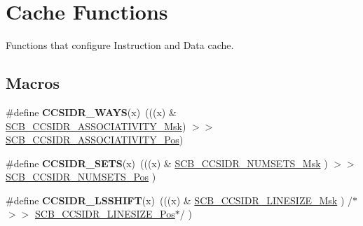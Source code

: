\hypertarget{group__CMSIS__Core__CacheFunctions}{}\section{Cache Functions}
\label{group__CMSIS__Core__CacheFunctions}


Functions that configure Instruction and Data cache.  


\subsection*{Macros}
\begin{DoxyCompactItemize}
\item 
\#define {\bfseries C\+C\+S\+I\+D\+R\+\_\+\+W\+A\+YS}(x)~(((x) \& \hyperlink{group__CMSIS__SCB_gae093c4c635dad43845967512fa87173a}{S\+C\+B\+\_\+\+C\+C\+S\+I\+D\+R\+\_\+\+A\+S\+S\+O\+C\+I\+A\+T\+I\+V\+I\+T\+Y\+\_\+\+Msk}) $>$$>$ \hyperlink{group__CMSIS__SCB_gae67f2f83976b819fb3039fc35cfef0fb}{S\+C\+B\+\_\+\+C\+C\+S\+I\+D\+R\+\_\+\+A\+S\+S\+O\+C\+I\+A\+T\+I\+V\+I\+T\+Y\+\_\+\+Pos})\hypertarget{group__CMSIS__Core__CacheFunctions_ga3d672529cd193537fe2a0141931c6ad9}{}\label{group__CMSIS__Core__CacheFunctions_ga3d672529cd193537fe2a0141931c6ad9}

\item 
\#define {\bfseries C\+C\+S\+I\+D\+R\+\_\+\+S\+E\+TS}(x)~(((x) \& \hyperlink{group__CMSIS__SCB_ga47d1f01185d7a039334031008386c5a8}{S\+C\+B\+\_\+\+C\+C\+S\+I\+D\+R\+\_\+\+N\+U\+M\+S\+E\+T\+S\+\_\+\+Msk}      ) $>$$>$ \hyperlink{group__CMSIS__SCB_ga1028d2c238f74d2aa021f53ffbe8d7ab}{S\+C\+B\+\_\+\+C\+C\+S\+I\+D\+R\+\_\+\+N\+U\+M\+S\+E\+T\+S\+\_\+\+Pos}      )\hypertarget{group__CMSIS__Core__CacheFunctions_gaf20feee7c52fee32b48ee0d2ceaaf932}{}\label{group__CMSIS__Core__CacheFunctions_gaf20feee7c52fee32b48ee0d2ceaaf932}

\item 
\#define {\bfseries C\+C\+S\+I\+D\+R\+\_\+\+L\+S\+S\+H\+I\+FT}(x)~(((x) \& \hyperlink{group__CMSIS__SCB_ga07b3bdffe4c289b9c19c70cf698499da}{S\+C\+B\+\_\+\+C\+C\+S\+I\+D\+R\+\_\+\+L\+I\+N\+E\+S\+I\+Z\+E\+\_\+\+Msk}     ) /$\ast$$>$$>$ \hyperlink{group__CMSIS__SCB_ga750388e1509b36d35568a68a7a1e1ff7}{S\+C\+B\+\_\+\+C\+C\+S\+I\+D\+R\+\_\+\+L\+I\+N\+E\+S\+I\+Z\+E\+\_\+\+Pos}$\ast$/ )\hypertarget{group__CMSIS__Core__CacheFunctions_ga60edd8f48c1382d93fc7daef51053681}{}\label{group__CMSIS__Core__CacheFunctions_ga60edd8f48c1382d93fc7daef51053681}

\end{DoxyCompactItemize}
